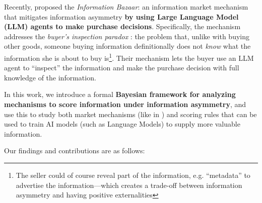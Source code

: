 
Recently,  proposed the \emph{Information Bazaar}: an information market mechanism that mitigates information asymmetry \textbf{by using Large Language Model (LLM) agents to make purchase decisions}. Specifically, the mechanism addresses the \emph{buyer's inspection paradox} \citep{arrow1972economic,vanAlstyne1999AproposalValuingInformationInstrumentalGoods}: the problem that, unlike with buying other goods, someone buying information definitionally does not \emph{know} what the information she is about to buy is\footnote{The seller could of course reveal part of the information, e.g. ``metadata'' to advertise the information---which creates a trade-off between information asymmetry and having positive externalities}. Their mechanism lets the buyer use an LLM agent to ``inspect'' the information and make the purchase decision with full knowledge of the information.

In this work, we introduce a formal \textbf{Bayesian framework for analyzing mechanisms to score information under information asymmetry}, and use this to study both market mechanisms (like in ) and scoring rules that can be used to train AI models (such as Language Models) to supply more valuable information.


Our findings and contributions are as follows:

